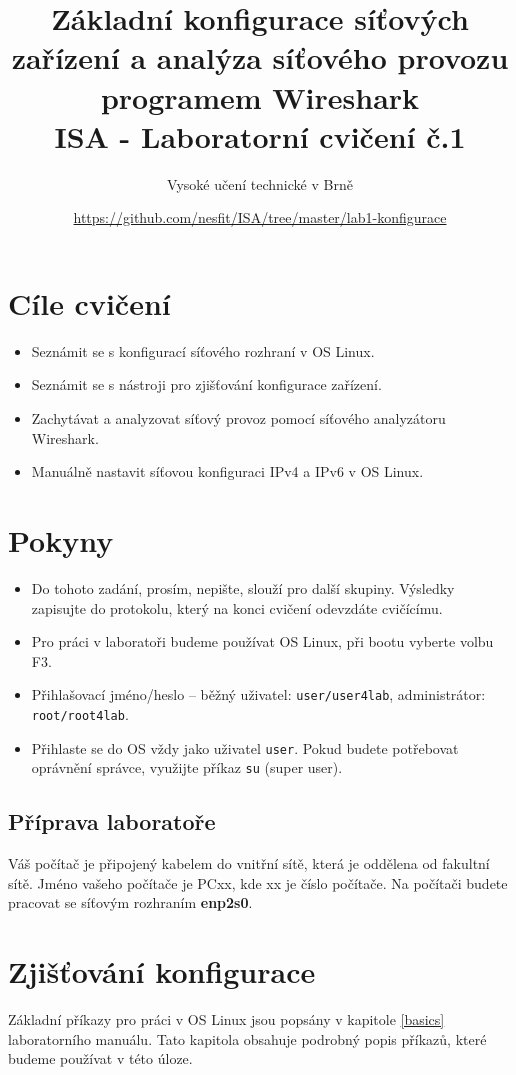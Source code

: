 \documentclass[a4paper,11pt]{article}
\title{Základní konfigurace síťových zařízení a analýza síťového provozu programem Wireshark\\
{\bf\large ISA - Laboratorní cvičení č.1}}
\author{Vysoké učení technické v Brně}
\date{\url{https://github.com/nesfit/ISA/tree/master/lab1-konfigurace}}
\begin{document}
{\let\newpage\relax\maketitle}

\section*{Cíle cvičení}
\begin{itemize}
  \item Seznámit se s konfigurací síťového rozhraní v OS Linux.
  \item Seznámit se s nástroji pro zjišťování konfigurace zařízení.
  \item Zachytávat a analyzovat síťový provoz pomocí síťového analyzátoru Wireshark.
  \item Manuálně nastavit síťovou konfiguraci IPv4 a IPv6 v OS Linux.
\end{itemize}

\section*{Pokyny}
\begin{itemize}
\item Do tohoto zadání, prosím, nepište, slouží pro další skupiny. Výsledky zapisujte do protokolu, který na konci cvičení odevzdáte cvičícímu. 
\item Pro práci v laboratoři budeme používat OS Linux, při bootu vyberte volbu F3.
\item Přihlašovací jméno/heslo -- běžný uživatel: \texttt{user/user4lab}, administrátor: \texttt{root/root4lab}.
\item Přihlaste se do OS vždy jako uživatel \texttt{user}. Pokud budete potřebovat oprávnění správce, využijte příkaz {\tt su} (super user).
\end{itemize}

\subsection*{Příprava laboratoře}
Váš počítač je připojený kabelem do vnitřní sítě, která je oddělena od fakultní sítě. Jméno vašeho počítače je PCxx, kde xx je číslo počítače. Na počítači budete pracovat se síťovým rozhraním {\bf enp2s0}.

\section{Zjišťování konfigurace}
Základní příkazy pro práci v OS Linux jsou popsány v kapitole \ref{basics} laboratorního manuálu. Tato kapitola obsahuje podrobný popis příkazů, které budeme používat v této úloze.
\end{document}
